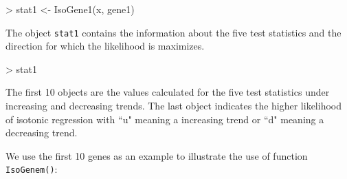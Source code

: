 \documentclass[10pt]{mybook4}
\begin{document}
\begin{Schunk}
\begin{Sinput}
> stat1 <- IsoGene1(x, gene1)
\end{Sinput}
\end{Schunk}

The object \texttt{stat1} contains the information about the five test statistics and the direction for which the likelihood is maximizes.

\begin{Schunk}
\begin{Sinput}
> stat1
\end{Sinput}
\end{Schunk}

The first 10 objects are the values calculated for the five test
statistics under increasing and decreasing trends. The last object
indicates the higher likelihood of isotonic regression with ``u"
meaning a increasing trend or ``d" meaning a decreasing trend.


We use the first 10 genes as an example to illustrate the use of
function \texttt{IsoGenem()}:
\end{document}
